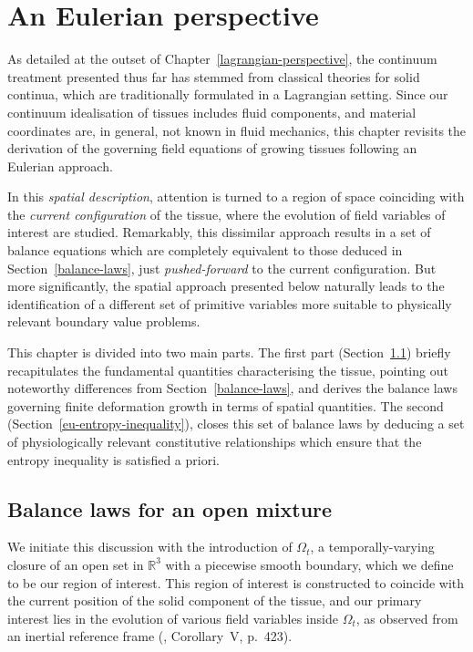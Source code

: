 \chapter{An Eulerian perspective}
\label{eulerian-perspective}

As detailed at the outset of Chapter~\ref{lagrangian-perspective}, the
continuum treatment presented thus far has stemmed from classical
theories for solid continua, which are traditionally formulated in a
Lagrangian setting. Since our continuum idealisation of tissues
includes fluid components, and material coordinates are, in general,
not known in fluid mechanics, this chapter revisits the derivation of
the governing field equations of growing tissues following an Eulerian
approach.

In this {\em spatial description}, attention is turned to a region of
space coinciding with the {\em current configuration} of the tissue,
where the evolution of field variables of interest are
studied. Remarkably, this dissimilar approach results in a set of
balance equations which are completely equivalent to those deduced in
Section~\ref{balance-laws}, just {\em pushed-forward} to the current
configuration. But more significantly, the spatial approach presented
below naturally leads to the identification of a different set of
primitive variables more suitable to physically relevant boundary
value problems.

This chapter is divided into two main parts. The first part
(Section~\ref{eu-balance-laws}) briefly recapitulates the fundamental
quantities characterising the tissue, pointing out noteworthy
differences from Section~\ref{balance-laws}, and derives the balance
laws governing finite deformation growth in terms of spatial
quantities. The second (Section~\ref{eu-entropy-inequality}), closes
this set of balance laws by deducing a set of physiologically relevant
constitutive relationships which ensure that the entropy inequality is
satisfied a priori.

\section{Balance laws for an open mixture}
\label{eu-balance-laws}

We initiate this discussion with the introduction of $\Omega_{t}$, a
temporally-varying closure of an open set in $\mathbb{R}^{3}$ with a
piecewise smooth boundary, which we define to be our region of
interest. This region of interest is constructed to coincide with the
current position of the solid component of the tissue, and our primary
interest lies in the evolution of various field variables inside
$\Omega_{t}$, as observed from an inertial reference frame
(\citet{newton1726}, Corollary~V, p.~423).

